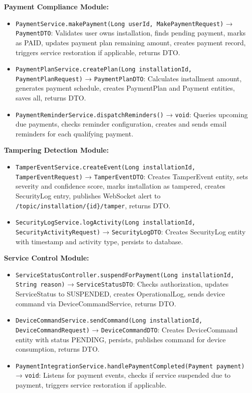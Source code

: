 \textbf{Payment Compliance Module:}
\begin{itemize}
    \item \texttt{PaymentService.makePayment(Long userId, MakePaymentRequest)} → \texttt{PaymentDTO}: Validates user owns installation, finds pending payment, marks as PAID, updates payment plan remaining amount, creates payment record, triggers service restoration if applicable, returns DTO.
    \item \texttt{PaymentPlanService.createPlan(Long installationId, PaymentPlanRequest)} → \texttt{PaymentPlanDTO}: Calculates installment amount, generates payment schedule, creates PaymentPlan and Payment entities, saves all, returns DTO.
    \item \texttt{PaymentReminderService.dispatchReminders()} → \texttt{void}: Queries upcoming due payments, checks reminder configuration, creates and sends email reminders for each qualifying payment.
\end{itemize}

\textbf{Tampering Detection Module:}
\begin{itemize}
    \item \texttt{TamperEventService.createEvent(Long installationId, TamperEventRequest)} → \texttt{TamperEventDTO}: Creates TamperEvent entity, sets severity and confidence score, marks installation as tampered, creates SecurityLog entry, publishes WebSocket alert to \texttt{/topic/installation/\{id\}/tamper}, returns DTO.
    \item \texttt{SecurityLogService.logActivity(Long installationId, SecurityActivityRequest)} → \texttt{SecurityLogDTO}: Creates SecurityLog entity with timestamp and activity type, persists to database.
\end{itemize}

\textbf{Service Control Module:}
\begin{itemize}
    \item \texttt{ServiceStatusController.suspendForPayment(Long installationId, String reason)} → \texttt{ServiceStatusDTO}: Checks authorization, updates ServiceStatus to SUSPENDED, creates OperationalLog, sends device command via DeviceCommandService, returns DTO.
    \item \texttt{DeviceCommandService.sendCommand(Long installationId, DeviceCommandRequest)} → \texttt{DeviceCommandDTO}: Creates DeviceCommand entity with status PENDING, persists, publishes command for device consumption, returns DTO.
    \item \texttt{PaymentIntegrationService.handlePaymentCompleted(Payment payment)} → \texttt{void}: Listens for payment events, checks if service suspended due to payment, triggers service restoration if applicable.
\end{itemize}

